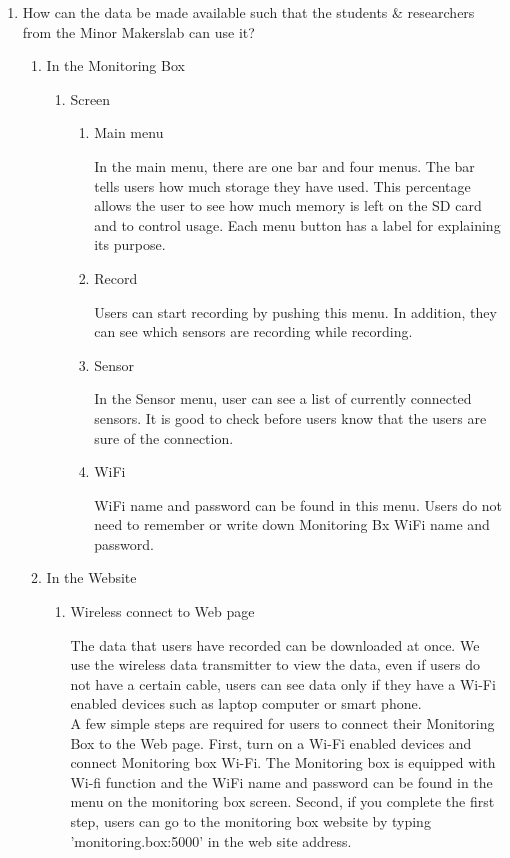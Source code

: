 \documentclass[conference]{IEEEtran}
\begin{document}
\begin{enumerate}
\item How can the data be made available such that the students \& researchers from the Minor Makerslab can use it?
\begin{enumerate}
\item In the Monitoring Box
\begin{enumerate}
\item Screen
\begin{enumerate}
\item Main menu

 In the main menu, there are one bar and four menus. The bar tells users how much storage they have used. This percentage allows the user to see how much memory is left on the SD card and to control usage. Each menu button has a label for explaining its purpose.\\
\item Record

 Users can start recording by pushing this menu. In addition, they can see which sensors are recording while recording.\\
\item Sensor

 In the Sensor menu, user can see a list of currently connected sensors. It is good to check before users know that the users are sure of the connection.\\
\item WiFi

 WiFi name and password can be found in this menu. Users do not need to remember or write down Monitoring Bx WiFi name and password.\\
\end{enumerate}

\end{enumerate}

\item In the Website
\begin{enumerate}
\item Wireless connect to Web page

 The data that users have recorded can be downloaded at once. We use the wireless data transmitter to view the data, even if users do not have a certain cable, users can see data only if they have a Wi-Fi enabled devices such as laptop computer or smart phone. \\
 A few simple steps are required for users to connect their Monitoring Box to the Web page. First, turn on a Wi-Fi enabled devices and connect Monitoring box Wi-Fi. The Monitoring box is equipped with Wi-fi function and the WiFi name and password can be found in the menu on the monitoring box screen. Second, if you complete the first step, users can go to the monitoring box website by typing 'monitoring.box:5000' in the web site address.\\


\end{enumerate}
\end{enumerate}
\end{enumerate}
\end{document}
